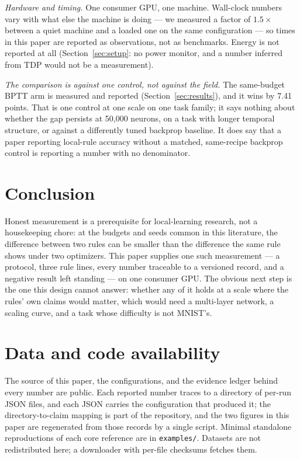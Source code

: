 \documentclass[11pt]{article}
\begin{document}
\emph{Hardware and timing.} One consumer GPU, one machine. Wall-clock numbers
vary with what else the machine is doing --- we measured a factor of $1.5\times$
between a quiet machine and a loaded one on the same configuration --- so times
in this paper are reported as observations, not as benchmarks. Energy is not
reported at all (Section~\ref{sec:setup}: no power monitor, and a number
inferred from TDP would not be a measurement).

\emph{The comparison is against one control, not against the field.} The
same-budget BPTT arm is measured and reported (Section~\ref{sec:results}), and it
wins by 7.41 points. That is one control at one scale on one task family; it says
nothing about whether the gap persists at 50{,}000 neurons, on a task with
longer temporal structure, or against a differently tuned backprop baseline. It
does say that a paper reporting local-rule accuracy without a matched,
same-recipe backprop control is reporting a number with no denominator.

\section{Conclusion}
Honest measurement is a prerequisite for local-learning research, not a
housekeeping chore: at the budgets and seeds common in this literature, the
difference between two rules can be smaller than the difference the same rule
shows under two optimizers. This paper supplies one such measurement --- a
protocol, three rule lines, every number traceable to a versioned record, and a
negative result left standing --- on one consumer GPU. The obvious next step is
the one this design cannot answer: whether any of it holds at a scale where the
rules' own claims would matter, which would need a multi-layer network, a
scaling curve, and a task whose difficulty is not MNIST's.

\section*{Data and code availability}
The source of this paper, the configurations, and the evidence ledger behind
every number are public. Each reported number traces to a directory of per-run
JSON files, and each JSON carries the configuration that produced it; the
directory-to-claim mapping is part of the repository, and the two figures in
this paper are regenerated from those records by a single script. Minimal
standalone reproductions of each core reference are in \texttt{examples/}.
Datasets are not redistributed here; a downloader with per-file checksums
fetches them.
\end{document}
